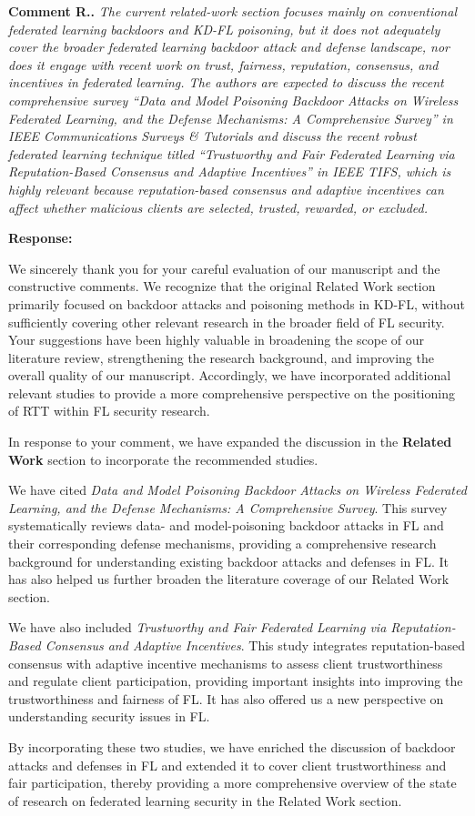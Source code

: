 \documentclass[11pt,a4paper]{article}
\newcommand{\manualindent}{\par\noindent\hspace*{1.5em}\ignorespaces}
\newcounter{reviewernum}
\newcounter{commentnum}
\newcommand{\reviewcomment}[1]{%
  \stepcounter{commentnum}%
  \begin{tcolorbox}[
      enhanced,breakable,colback=black!3,colframe=black!20,
      boxrule=0.5pt,arc=1.2mm,left=9pt,right=9pt,top=8pt,bottom=8pt]
    {\bfseries Comment R\arabic{reviewernum}.\arabic{commentnum}.}\quad
    {\itshape #1}
  \end{tcolorbox}%
}
\newcommand{\authorresponse}[1]{%
  {\bfseries\color{replyblue}Response:}\par
  #1\par\vspace{0.35em}%
}
\begin{document}
\reviewcomment{The current related-work section focuses mainly on conventional federated learning backdoors and KD-FL poisoning, but it does not adequately cover the broader federated learning backdoor attack and defense landscape, nor does it engage with recent work on trust, fairness, reputation, consensus, and incentives in federated learning. The authors are expected to discuss the recent comprehensive survey “Data and Model Poisoning Backdoor Attacks on Wireless Federated Learning, and the Defense Mechanisms: A Comprehensive Survey” in IEEE Communications Surveys \& Tutorials and discuss the recent robust federated learning technique titled “Trustworthy and Fair Federated Learning via Reputation-Based Consensus and Adaptive Incentives” in IEEE TIFS, which is highly relevant because reputation-based consensus and adaptive incentives can affect whether malicious clients are selected, trusted, rewarded, or excluded.}

\authorresponse{
\manualindent We sincerely thank you for your careful evaluation of our manuscript and the constructive comments.
We recognize that the original Related Work section primarily focused on backdoor attacks and poisoning methods in KD-FL, without sufficiently covering other relevant research in the broader field of FL security.
Your suggestions have been highly valuable in broadening the scope of our literature review, strengthening the research background, and improving the overall quality of our manuscript.
Accordingly, we have incorporated additional relevant studies to provide a more comprehensive perspective on the positioning of RTT within FL security research.

\manualindent In response to your comment, we have expanded the discussion in the \textbf{Related Work} section to incorporate the recommended studies.

\manualindent We have cited \textit{Data and Model Poisoning Backdoor Attacks on Wireless Federated Learning, and the Defense Mechanisms: A Comprehensive Survey}.
This survey systematically reviews data- and model-poisoning backdoor attacks in FL and their corresponding defense mechanisms, providing a comprehensive research background for understanding existing backdoor attacks and defenses in FL.
It has also helped us further broaden the literature coverage of our Related Work section.
\manualindent We have also included \textit{Trustworthy and Fair Federated Learning via Reputation-Based Consensus and Adaptive Incentives}.
This study integrates reputation-based consensus with adaptive incentive mechanisms to assess client trustworthiness and regulate client participation, providing important insights into improving the trustworthiness and fairness of FL.
It has also offered us a new perspective on understanding security issues in FL.

\manualindent By incorporating these two studies, we have enriched the discussion of backdoor attacks and defenses in FL and extended it to cover client trustworthiness and fair participation, thereby providing a more comprehensive overview of the state of research on federated learning security in the Related Work section.
}
\end{document}
